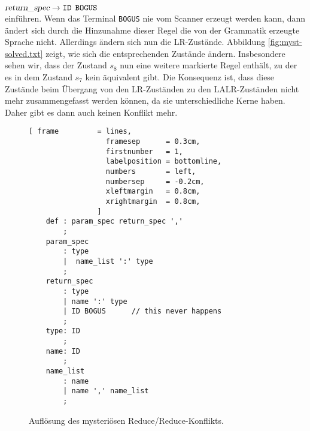 $\textsl{return\_spec} \rightarrow \mathtt{ID}\;\, \mathtt{BOGUS}$
\\[0.2cm]
einf\"uhren.  Wenn das Terminal \texttt{BOGUS} nie vom Scanner erzeugt werden kann, dann \"andert sich durch
die Hinzunahme dieser Regel die von der Grammatik erzeugte Sprache nicht.  Allerdings \"andern sich nun die
LR-Zust\"ande.  Abbildung \ref{fig:myst-solved.txt} zeigt, wie sich die entsprechenden Zust\"ande \"andern.
Insbesondere sehen wir, dass der Zustand $s_8$ nun eine weitere markierte Regel enth\"alt, zu der es in dem
Zustand $s_7$ kein \"aquivalent gibt.  Die Konsequenz ist, dass diese Zust\"ande beim \"Ubergang von den
LR-Zust\"anden zu den LALR-Zust\"anden nicht mehr zusammengefasst werden k\"onnen, da sie unterschiedliche
Kerne haben.  Daher gibt es dann auch keinen Konflikt mehr. 

\begin{figure}[!ht]
\centering
\begin{Verbatim}[ frame         = lines, 
                  framesep      = 0.3cm, 
                  firstnumber   = 1,
                  labelposition = bottomline,
                  numbers       = left,
                  numbersep     = -0.2cm,
                  xleftmargin   = 0.8cm,
                  xrightmargin  = 0.8cm,
                ]
    def : param_spec return_spec ','
        ;    
    param_spec
        : type
        |  name_list ':' type
        ;
    return_spec
        : type
        | name ':' type
        | ID BOGUS      // this never happens
        ;
    type: ID
        ;
    name: ID
        ;
    name_list
        : name
        | name ',' name_list
        ;
\end{Verbatim}
\vspace*{-0.3cm}
\caption{Aufl\"osung des mysteri\"osen Reduce/Reduce-Konflikts.}
\label{fig:myst-solved.g}
\end{figure}

